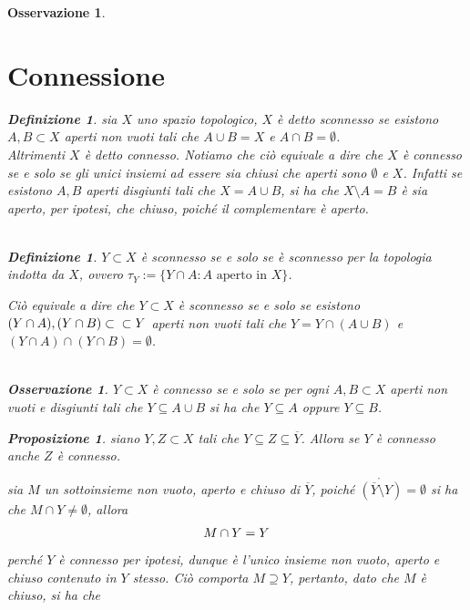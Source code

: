 \documentclass[oneside, 11pt]{amsbook}
\makeatletter
\newcommand{\0}{{(0)}}
\newcommand{\3}{{(3)}}
\theoremstyle{colonplain}
\newtheorem{prop}[thm]{Proposizione}
\theoremstyle{colondefinition}
\newtheorem{defn}[thm]{Definizione}
\theoremstyle{colonremark}
\newtheorem{rmk}[thm]{Osservazione}
\numberwithin{equation}{chapter}
\renewcommand{\proofname}{Dimostrazione}
\renewenvironment{proof}[1][\proofname]{\par
  \pushQED{\end{proof}}%
  \normalfont \topsep6\p@\@plus6\p@\relax
  \trivlist
  \item[\hskip\labelsep\bfseries #1:]\ignorespaces
}{%
  \popQED\endtrivlist\@endpefalse
}
\makeatother
\begin{document}
\begin{rmk}
\section{Connessione}
\begin{defn}
sia $X$ uno spazio topologico, $X$ è detto \textit{sconnesso} se esistono $A, B \subset X$ aperti non vuoti tali che $A \cup B = X$ e $A \cap B = \emptyset$. \\ Altrimenti $X$ è detto \textit{connesso}.
\end{proof}
Notiamo che ciò equivale a dire che $X$ è \textit{connesso} se e solo se gli unici insiemi ad essere sia chiusi che aperti sono $\emptyset$ e $X$. Infatti se esistono $A, B$ aperti disgiunti tali che $X = A \cup B$, si ha che $X \setminus A = B$ è sia aperto, per ipotesi, che chiuso, poiché il complementare è aperto. \\ \\
\begin{defn}
$Y \subset X$ è \textit{sconnesso} se e solo se è sconnesso per la topologia indotta da $X$, ovvero $\tau_Y := \{ Y \cap A : A \text{ aperto in } X \}$.
\end{defn}
Ciò equivale a dire che $Y \subset X$ è \textit{sconnesso} se e solo se esistono $(Y \cap A), (Y \cap B) \subset\\\subset Y$ aperti non vuoti tali che $Y = Y \cap (A \cup B)$ e $(Y \cap A) \cap (Y \cap B) = \emptyset$. \\ \\
\begin{rmk}
$Y \subset X$ è \textit{connesso} se e solo se per ogni $A, B \subset X$ aperti non vuoti e disgiunti tali che $Y \subseteq A \cup B$ si ha che $Y \subseteq A$ oppure $Y \subseteq B$.
\end{rmk}
\begin{prop}
siano $Y, Z \subset X$ tali che $Y \subseteq Z \subseteq \overline{Y}$. Allora se $Y$ è connesso anche $Z$ è connesso.
\end{proof}
\begin{proof}
sia $M$ un sottoinsieme non vuoto, aperto e chiuso di $\overline{Y}$, poiché $\mathring{(\overline{Y} \setminus Y)} = \emptyset$ si ha che $M \cap Y \neq \emptyset$, allora
\begin{align}
    M \cap Y = Y \notag
\end{align}
perché $Y$ è connesso per ipotesi, dunque è l'unico insieme non vuoto, aperto e chiuso contenuto in $Y$ stesso. Ciò comporta $M \supseteq Y$, pertanto, dato che $M$ è chiuso, si ha che
\begin{align}

\end{align}
\end{proof}
\end{prop}
\end{defn}
\end{rmk}
\end{document}
